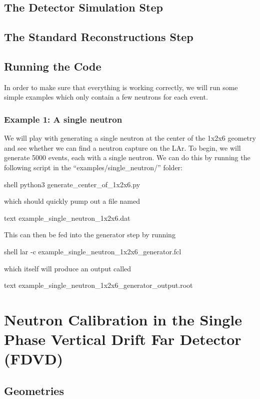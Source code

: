 \documentclass[8pt]{refart}
\begin{document}
\subsection{The Detector Simulation Step}

\subsection{The Standard Reconstructions Step}

\subsection{Running the Code}\label{runningthecode}
In order to make sure that everything is working correctly, we will run some simple examples which only contain a few neutrons for each event.
\subsubsection{Example 1: A single neutron}
We will play with generating a single neutron at the center of the 1x2x6 geometry and see whether we can find a neutron capture on the LAr. To begin, we will generate 5000 events, each with a single neutron.  We can do this by running the following script in the ``examples/single\_neutron/'' folder:
\begin{code}{shell}
python3 generate_center_of_1x2x6.py
\end{code}
which should quickly pump out a file named
\begin{code}{text}
example\_single\_neutron\_1x2x6.dat
\end{code}
This can then be fed into the generator step by running
\begin{code}{shell}
lar -c example_single_neutron_1x2x6_generator.fcl
\end{code}
which itself will produce an output called
\begin{code}{text}
example\_single\_neutron\_1x2x6\_generator\_output.root
\end{code}



\newpage 
\section{Neutron Calibration in the Single Phase Vertical Drift Far Detector (FDVD)}


\subsection{Geometries}
\end{document}
